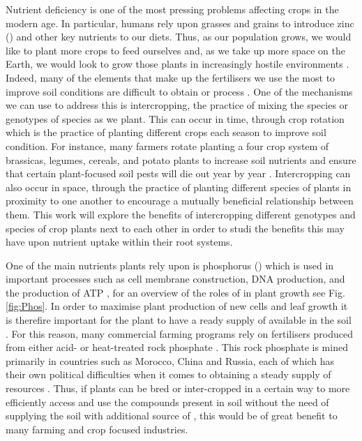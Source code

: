 \documentclass[11pt]{article}
\numberwithin{equation}{section}
\begin{document}
Nutrient deficiency is one of the most pressing problems affecting crops in the modern age. In particular, humans rely upon grasses and grains to introduce zinc () and other key nutrients to our diets. Thus, as our population grows, we would like to plant more crops to feed ourselves and, as we take up more space on the Earth, we would look to grow those plants in increasingly hostile environments \cite{calicioglu_2019}. Indeed,  many of the elements that make up the fertilisers we use the most to improve soil conditions are difficult to obtain or process \cite{fact.mr_2021}. One of the mechanisms we can use to address this is intercropping, the practice of mixing the species or genotypes of species as we plant. This can occur in time, through crop rotation which is the practice of planting different crops each season to improve soil condition. For instance, many farmers rotate planting a four crop system of brassicas, legumes, cereals, and potato plants to increase soil nutrients and ensure that certain plant-focused soil pests will die out year by year \cite{xuan_2011}. Intercropping can also occur in space, through the practice of planting different species of plants in proximity to one another to encourage a mutually beneficial relationship between them. This work will explore the benefits of intercropping different genotypes and species of crop plants next to each other in order to studi the benefits this may have upon nutrient uptake within their root systems.

One of the main nutrients plants rely upon is phosphorus () which is used in important processes such as cell membrane construction, DNA production, and the production of ATP \cite{vysotskaya_2016}, for an overview of the roles of  in plant growth see Fig. \ref{fig:Phos}. In order to maximise plant production of new cells and leaf growth it is therefire important for the plant to have a ready supply of  available in the soil \cite{vysotskaya_2016}. For this reason, many commercial farming programs rely on  fertilisers produced from either acid- or heat-treated rock phosphate \cite{PhosporusRecoveryandRecycling}. This rock phosphate is mined primarily in countries such as Morocco, China and Russia, each of which has their own political difficulties when it comes to obtaining a steady supply of resources \cite{fact.mr_2021}. Thus, if plants can be bred or inter-cropped in a certain way to more efficiently access and use the  compounds present in soil without the need of supplying the soil with additional source of , this would be of great benefit to many farming and crop focused industries.
\end{document}
